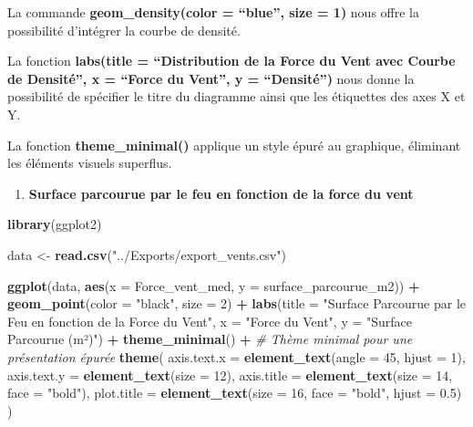 \documentclass[
]{article}
\newenvironment{Shaded}{\begin{snugshade}}{\end{snugshade}}
\newcommand{\AttributeTok}[1]{\textcolor[rgb]{0.13,0.29,0.53}{#1}}
\newcommand{\CommentTok}[1]{\textcolor[rgb]{0.56,0.35,0.01}{\textit{#1}}}
\newcommand{\DecValTok}[1]{\textcolor[rgb]{0.00,0.00,0.81}{#1}}
\newcommand{\FloatTok}[1]{\textcolor[rgb]{0.00,0.00,0.81}{#1}}
\newcommand{\FunctionTok}[1]{\textcolor[rgb]{0.13,0.29,0.53}{\textbf{#1}}}
\newcommand{\NormalTok}[1]{#1}
\newcommand{\OtherTok}[1]{\textcolor[rgb]{0.56,0.35,0.01}{#1}}
\newcommand{\SpecialCharTok}[1]{\textcolor[rgb]{0.81,0.36,0.00}{\textbf{#1}}}
\newcommand{\StringTok}[1]{\textcolor[rgb]{0.31,0.60,0.02}{#1}}
\providecommand{\tightlist}{%
  \setlength{\itemsep}{0pt}\setlength{\parskip}{0pt}}
\begin{document}
La commande \textbf{geom\_density(color = ``blue'', size = 1)} nous
offre la possibilité d'intégrer la courbe de densité.

La fonction \textbf{labs(title = ``Distribution de la Force du Vent avec
Courbe de Densité'', x = ``Force du Vent'', y = ``Densité'')} nous donne
la possibilité de spécifier le titre du diagramme ainsi que les
étiquettes des axes X et Y.

La fonction \textbf{theme\_minimal()} applique un style épuré au
graphique, éliminant les éléments visuels superflus.

\begin{enumerate}
\def\labelenumi{\arabic{enumi}.}
\setcounter{enumi}{1}
\tightlist
\item
  \textbf{Surface parcourue par le feu en fonction de la force du vent}
\end{enumerate}

\begin{Shaded}
\begin{Highlighting}[]
\FunctionTok{library}\NormalTok{(ggplot2)}

\NormalTok{data }\OtherTok{\textless{}{-}} \FunctionTok{read.csv}\NormalTok{(}\StringTok{"../Exports/export\_vents.csv"}\NormalTok{)}

\FunctionTok{ggplot}\NormalTok{(data, }\FunctionTok{aes}\NormalTok{(}\AttributeTok{x =}\NormalTok{ Force\_vent\_med, }\AttributeTok{y =}\NormalTok{ surface\_parcourue\_m2)) }\SpecialCharTok{+}
  \FunctionTok{geom\_point}\NormalTok{(}\AttributeTok{color =} \StringTok{"black"}\NormalTok{, }\AttributeTok{size =} \DecValTok{2}\NormalTok{) }\SpecialCharTok{+} 
  \FunctionTok{labs}\NormalTok{(}\AttributeTok{title =} \StringTok{"Surface Parcourue par le Feu en fonction de la Force du Vent"}\NormalTok{, }
       \AttributeTok{x =} \StringTok{"Force du Vent"}\NormalTok{, }
       \AttributeTok{y =} \StringTok{"Surface Parcourue (m²)"}\NormalTok{) }\SpecialCharTok{+}
  \FunctionTok{theme\_minimal}\NormalTok{() }\SpecialCharTok{+}  \CommentTok{\# Thème minimal pour une présentation épurée}
  \FunctionTok{theme}\NormalTok{(}
    \AttributeTok{axis.text.x =} \FunctionTok{element\_text}\NormalTok{(}\AttributeTok{angle =} \DecValTok{45}\NormalTok{, }\AttributeTok{hjust =} \DecValTok{1}\NormalTok{),}
    \AttributeTok{axis.text.y =} \FunctionTok{element\_text}\NormalTok{(}\AttributeTok{size =} \DecValTok{12}\NormalTok{),}
    \AttributeTok{axis.title =} \FunctionTok{element\_text}\NormalTok{(}\AttributeTok{size =} \DecValTok{14}\NormalTok{, }\AttributeTok{face =} \StringTok{"bold"}\NormalTok{),}
    \AttributeTok{plot.title =} \FunctionTok{element\_text}\NormalTok{(}\AttributeTok{size =} \DecValTok{16}\NormalTok{, }\AttributeTok{face =} \StringTok{"bold"}\NormalTok{, }\AttributeTok{hjust =} \FloatTok{0.5}\NormalTok{)}
\NormalTok{  )}
\end{Highlighting}
\end{Shaded}
\end{document}
